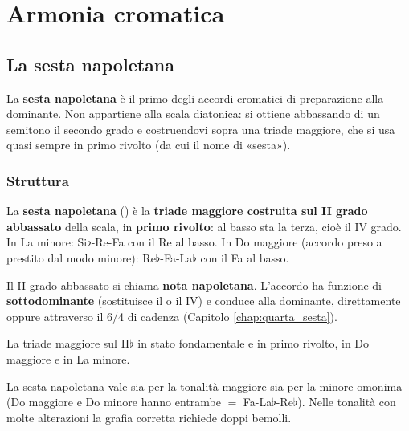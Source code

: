 \part{Armonia cromatica}

\chapter{La sesta napoletana}
\label{chap:sesta_napoletana}

La \textbf{sesta napoletana} è il primo degli accordi cromatici di preparazione alla dominante. Non appartiene alla scala diatonica: si ottiene abbassando di un semitono il secondo grado e costruendovi sopra una triade maggiore, che si usa quasi sempre in primo rivolto (da cui il nome di «sesta»).

\section{Struttura}
\label{sec:struttura_napoletana}

\begin{definizione}
	\label{def:sesta_napoletana}
	La \textbf{sesta napoletana} () è la \textbf{triade maggiore costruita sul II grado abbassato} della scala, in \textbf{primo rivolto}: al basso sta la terza, cioè il IV grado. In La minore: Si$\flat$-Re-Fa con il Re al basso. In Do maggiore (accordo preso a prestito dal modo minore): Re$\flat$-Fa-La$\flat$ con il Fa al basso.
\end{definizione}

Il II grado abbassato si chiama \textbf{nota napoletana}. L'accordo ha funzione di \textbf{sottodominante} (sostituisce il  o il IV) e conduce alla dominante, direttamente oppure attraverso il 6/4 di cadenza (Capitolo \ref{chap:quarta_sesta}).

\begin{esempio}
	\label{ex:costruzione_napoletana}
	La triade maggiore sul II$\flat$ in stato fondamentale e in primo rivolto, in Do maggiore e in La minore.
\end{esempio}

La sesta napoletana vale sia per la tonalità maggiore sia per la minore omonima (Do maggiore e Do minore hanno entrambe  $=$ Fa-La$\flat$-Re$\flat$). Nelle tonalità con molte alterazioni la grafia corretta richiede doppi bemolli.


